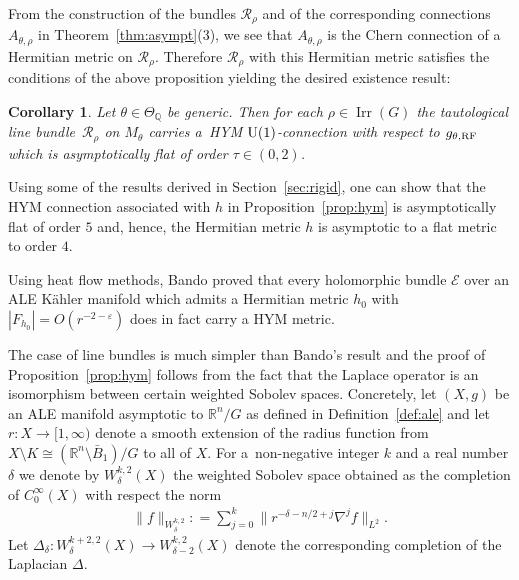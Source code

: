 \documentclass[10pt,a4paper]{amsart}
\numberwithin{equation}{section}
\newcommand{\cE}{\mathcal{E}}
\newcommand{\cR}{\mathcal{R}}
\newcommand{\Q}{{\mathbb Q}}
\newcommand{\R}{{\mathbb R}}
\newcommand{\U}{{\rm U}}
\renewcommand{\epsilon}{\varepsilon}
\newcommand{\eps}{\epsilon}
\newcommand{\Irr}{\operatorname{Irr}}
\newcommand{\iso}{\cong}
\newcommand{\RF}{{\rm RF}}
\newtheorem{Corollary}[Theorem]{Corollary}
\begin{document}
From the construction of the bundles $\cR_{\rho}$ and of the
corresponding connections $A_{\theta,\rho}$ in
Theorem~\ref{thm:asympt}(3), we see that
$A_{\theta, \rho}$ is the Chern connection of a Hermitian metric on
$\cR_{\rho}$. Therefore $\cR_{\rho}$ with this Hermitian metric
satisf\/ies the conditions of the above proposition yielding the desired
existence result:

\begin{Corollary}
  Let $\theta \in \Theta_{\Q}$ be generic.  Then for each
  $\rho\in\Irr(G)$ the tautological line bundle~$\cR_\rho$ on
  $M_\theta$ carries a~HYM $\U(1)$-connection with respect to
  $g_{\theta,\RF}$ which is asymptotically flat of order $\tau \in (0,2)$.
\end{Corollary}

\begin{Remark}
  Using some of the results derived in Section~\ref{sec:rigid}, one
  can show that the HYM connection associated with $h$ in
  Proposition~\ref{prop:hym} is asymptotically f\/lat of order $5$ and,
  hence, the Hermitian metric $h$ is asymptotic to a f\/lat metric to
  order $4$.
\end{Remark}

\begin{Remark}
  Using heat f\/low methods, Bando \cite{Bando1993} proved that every
  holomorphic bundle $\cE$ over an ALE K\"ahler manifold which admits a
  Hermitian metric $h_0$ with $|F_{h_0}|=O(r^{-2-\eps})$ does in
  fact carry a HYM metric.
\end{Remark}

The case of line bundles is much simpler than Bando's result and the
proof of Proposition~\ref{prop:hym} follows from the fact that the
Laplace operator is an isomorphism between certain weighted Sobolev
spaces.  Concretely, let $(X, g)$ be an ALE manifold asymptotic to
$\R^n/G$ as def\/ined in Def\/inition~\ref{def:ale} and let $r\colon
X\to[1,\infty)$ denote a smooth extension of the radius function from
$X{\setminus} K \iso (\R^n{\setminus} \bar B_1)/G$ to all of $X$.  For a~non-negative integer $k$ and a real number $\delta$ we denote by
$W^{k,2}_{\delta}(X)$ the weighted Sobolev space obtained as the
completion of $C^\infty_0(X)$ with respect the norm
\begin{gather}\label{eq:wsf}
  \|f\|_{W^{k,2}_\delta}: = \sum_{j=0}^k \big\|r^{-\delta-n/2+j}\nabla ^jf\big\|_{L^2}.
\end{gather}
Let $\Delta_{\delta}\colon W^{k+2,2}_\delta(X) \to W^{k,2}_{\delta-2}(X)$
denote the corresponding completion of the Laplacian $\Delta$.
\end{document}
